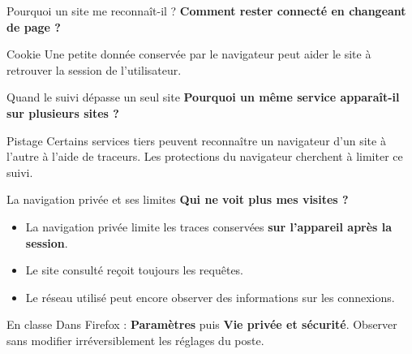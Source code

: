 \documentclass[aspectratio=169,11pt]{beamer}
\newcommand{\question}[1]{{\Large\color{or}\bfseries #1}}
\begin{document}
\begin{frame}{Pourquoi un site me reconnaît-il ?}
\question{Comment rester connecté en changeant de page ?}
\vspace{6mm}
\begin{center}
\end{center}
\vspace{7mm}
\begin{block}{Cookie}
Une petite donnée conservée par le navigateur peut aider le site à retrouver la session de l'utilisateur.
\end{block}
\end{frame}

\begin{frame}{Quand le suivi dépasse un seul site}
\question{Pourquoi un même service apparaît-il sur plusieurs sites ?}
\vspace{4mm}
\begin{center}
\end{center}
\pause
\begin{block}{Pistage}
Certains services tiers peuvent reconnaître un navigateur d'un site à l'autre à l'aide de traceurs. Les protections du navigateur cherchent à limiter ce suivi.
\end{block}
\end{frame}

\begin{frame}{La navigation privée et ses limites}
\question{Qui ne voit plus mes visites ?}
\vspace{6mm}
\begin{itemize}\setlength{\itemsep}{6mm}
\item La navigation privée limite les traces conservées \textbf{sur l'appareil après la session}.
\pause
\item Le site consulté reçoit toujours les requêtes.
\pause
\item Le réseau utilisé peut encore observer des informations sur les connexions.
\end{itemize}
\vspace{4mm}
\begin{block}{En classe}
Dans Firefox : \textbf{Paramètres} puis \textbf{Vie privée et sécurité}. Observer sans modifier irréversiblement les réglages du poste.
\end{block}
\end{frame}
\end{document}
